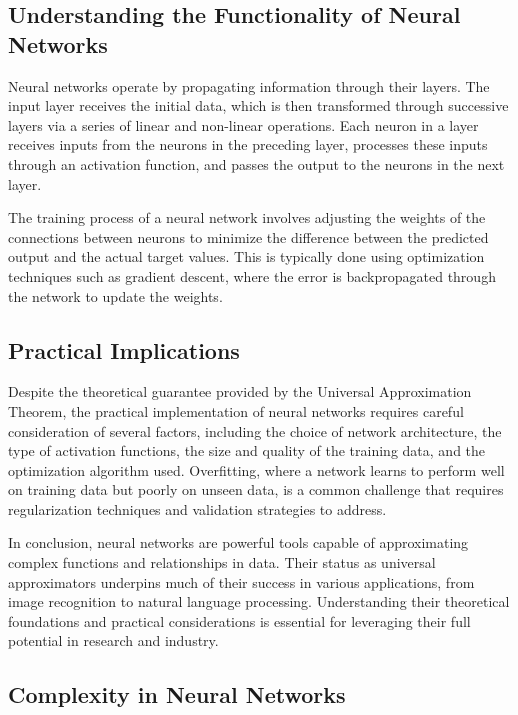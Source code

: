 \documentclass[11pt,a4paper]{article}
\begin{document}
\subsection{Understanding the Functionality of Neural Networks}

Neural networks operate by propagating information through their layers. The input layer receives the initial data, which is then transformed through successive layers via a series of linear and non-linear operations. Each neuron in a layer receives inputs from the neurons in the preceding layer, processes these inputs through an activation function, and passes the output to the neurons in the next layer.

The training process of a neural network involves adjusting the weights of the connections between neurons to minimize the difference between the predicted output and the actual target values. This is typically done using optimization techniques such as gradient descent, where the error is backpropagated through the network to update the weights.

\subsection{Practical Implications}

Despite the theoretical guarantee provided by the Universal Approximation Theorem, the practical implementation of neural networks requires careful consideration of several factors, including the choice of network architecture, the type of activation functions, the size and quality of the training data, and the optimization algorithm used. Overfitting, where a network learns to perform well on training data but poorly on unseen data, is a common challenge that requires regularization techniques and validation strategies to address.

In conclusion, neural networks are powerful tools capable of approximating complex functions and relationships in data. Their status as universal approximators underpins much of their success in various applications, from image recognition to natural language processing. Understanding their theoretical foundations and practical considerations is essential for leveraging their full potential in research and industry.

\subsection{Complexity in Neural Networks}
\end{document}
